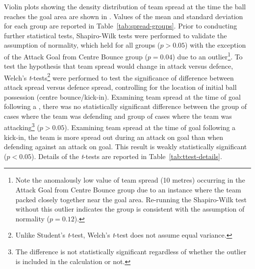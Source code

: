 Violin plots showing the density distribution of team spread at the time the ball reaches the goal area are shown in . Values of the mean and standard deviation for each group are reported in Table~\ref{tab:spread-groups}. Prior to conducting further statistical tests, Shapiro-Wilk tests were performed to validate the assumption of normality, which held for all groups ($p > 0.05$) with the exception of the Attack Goal from Centre Bounce group ($p = 0.04$) due to an outlier\footnote{Note the anomalously low value of team spread (10 metres) occurring in the Attack Goal from Centre Bounce group due to an instance where the team packed closely together near the goal area. Re-running the Shapiro-Wilk test without this outlier indicates the group is consistent with the assumption of normality ($p = 0.12$).}. To test the hypothesis that team spread would change in attack versus defence, Welch's \textit{t}-tests\footnote{Unlike Student's \textit{t}-test, Welch's \textit{t}-test does not assume equal variance.} were performed to test the significance of difference between attack spread versus defence spread, controlling for the location of initial ball possession (centre bounce/kick-in). Examining team spread at the time of goal following a \centrebounce{}, there was no statistically significant difference between the group of cases where the team was defending and group of cases where the team was attacking\footnote{The difference is not statistically significant regardless of whether the outlier is included in the calculation or not.} ($p > 0.05$). Examining team spread at the time of goal following a kick-in, the team is more spread out during an attack on goal than when defending against an attack on goal. This result is weakly statistically significant ($p < 0.05$). Details of the \textit{t}-tests are reported in Table~\ref{tab:ttest-details}.


%
%

